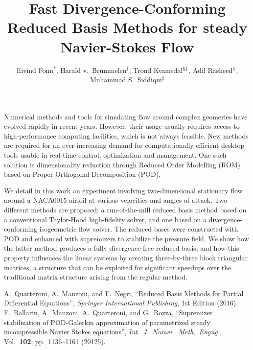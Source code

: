\documentclass[11pt,A4]{IGAA2018_Abstract}
\title{Fast Divergence-Conforming Reduced Basis Methods for steady Navier-Stokes Flow}
\author{
  Eivind Fonn$^{*}$, Harald v.~Brummelen$^{\dagger}$,
  Trond Kvamsdal$^{\mathsection\ddagger}$, Adil Rasheed$^{\mathsection}$,
  Muhammad S.~Siddiqui$^{\ddagger}$
}
\begin{document}
Numerical methods and tools for simulating flow around complex
geomeries have evolved rapidly in recent years. However, their usage
usually requires access to high-performance computing facilities,
which is not always feasible. New methods are required for an
ever-increasing demand for computationally efficient desktop tools
usable in real-time control, optimization and management. One such
solution is dimensionality reduction through Reduced Order Modelling
(ROM) based on Proper Orthogonal Decomposition
(POD).\cite{Quarteroni2016rbm}

We detail in this work an experiment involving two-dimensional
stationary flow around a NACA0015 airfoil at various velocities and
angles of attack. Two different methods are proposed: a
run-of-the-mill reduced basis method based on a conventional
Taylor-Hood high-fidelity solver, and one based on a
divergence-conforming isogeometric flow solver. The reduced bases were
constructed with POD and enhanced with
supremizers\cite{Ballarin2015ssp} to stabilize the pressure field. We
show how the latter method produces a fully divergence-free reduced
basis, and how this property influences the linear systems by creating
three-by-three block triangular matrices, a structure that can be
exploited for significant speedups over the traditional matrix
structure arising from the regular method.

\begin{thebibliography}{99}
   A.~Quarteroni, A.~Manzoni, and F.~Negri,
    “Reduced Basis Methods for Partial Differential Equations”,
    \textit{Springer International Publishing}, 1st Edition (2016).
   F.~Ballarin, A.~Manzoni, A.~Quarteroni,
    and G.~Rozza, “Supremizer stabilization of POD-Galerkin
    approximation of parametrized steady incompressible Navier Stokes
    equations”, \textit{Int.~J.~Numer.~Meth.~Engng.},
    Vol.~\textbf{102}, pp.~1136--1161 (20125).
\end{thebibliography}
\end{document}
